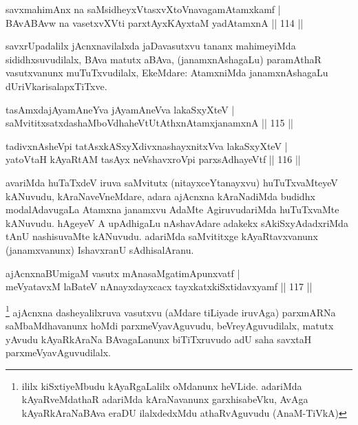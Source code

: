 
\begin{shl}
savxmahimAnx na saMsidheyxVtasxvXtoV\s navagamAtamxkamf |\\
BAvABAvw na vasetxvXVti parxtAyxKAyxtaM yadAtamxnA \hfill || 114 ||
\end{shl}

\begin{artha}%
savxrUpadalilx jAcnxnavilalxda jaDavasutxvu tananx mahimeyiMda sididhxsuvudilalx, BAva matutx aBAva, (janamxnAshagaLu) paramAthaR vasutxvanunx muTuTxvudilalx, EkeMdare: AtamxniMda janamxnAshagaLu dUriVkarisalapxTiTxve.
\end{artha}


\begin{shl}
tasAmxdajAyamAneYva jAyamAneVva lakaSxyXteV |\\
saMvititxsatxdashaMboVdhaheVtUtAthxnAtamxjanamxnA \hfill || 115 ||
\end{shl}

\begin{shl}
tadivxnAsheV\s pi tatAsxkASxyXdivxnashayxnitxVva lakaSxyXteV |\\
yatoV\s taH kAyaRtAM tasAyx neVshavxroV\s pi parxsAdhayeVtf \hfill || 116 ||
\end{shl}

\begin{artha}
avariMda huTaTxdeV iruva saMvitutx (nitayxceYtanayxvu) huTuTxvaMteyeV kANuvudu, kAraNaveVneMdare, adara ajAcnxna kAraNadiMda budidhx modalAdavugaLa Atamxna janamxvu AdaMte AgiruvudariMda huTuTxvaMte kANuvudu. hAgeyeV A upAdhigaLu nAshavAdare adakekx sAkiSxyAdadxriMda tAnU nashisuvaMte kANuvudu. adariMda saMvititxge kAyaRtavxvanunx (janamxvanunx) IshavxranU sAdhisalAranu.
\end{artha}


\begin{shl}
ajAcnxnaBUmigaM vasutx mAnasaMgatimApunxvatf |\\
meVyatavxM laBateV nAnayxdayxcacx tayxkatxkiSxtidavxyamf \hfill || 117 ||
\end{shl}

\begin{artha}
\footnote[1]{ililx kiSxtiyeMbudu kAyaRgaLalilx oMdanunx heVLide. adariMda kAyaRveMdathaR adariMda kAraNavanunx garxhisabeVku, AvAga kAyaRkAraNaBAva eraDU ilalxdedxMdu athaRvAguvudu (AnaM-TiVkA)}
ajAcnxna dasheyalilxruva vasutxvu (aMdare tiLiyade iruvAga) parxmARNa saMbaMdhavanunx hoMdi parxmeVyavAguvudu, beVreyAguvudilalx, matutx yAvudu kAyaRkAraNa BAvagaLanunx biTiTxruvudo adU saha savxtaH parxmeVyavAguvudilalx.
\end{artha}

